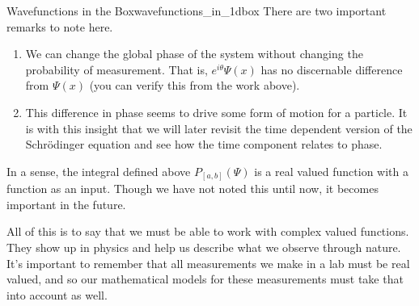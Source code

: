 \begin{ex}{Wavefunctions in the Box}{wavefunctions_in_1dbox}
	There are two important remarks to note here.
	\begin{enumerate}[1.]
		\item We can change the global phase of the system without changing the probability of measurement.  That is, $e^{i\theta}\Psi(x)$ has no discernable difference from $\Psi(x)$ (you can verify this from the work above).
		\item This difference in phase seems to drive some form of motion for a particle.  It is with this insight that we will later revisit the time dependent version of the Schr\"odinger equation and see how the time component relates to phase.
	\end{enumerate}
\end{ex}

\begin{remark}
	In a sense, the integral defined above $P_{[a,b]}(\Psi)$ is a real valued function with a function as an input.  Though we have not noted this until now, it becomes important in the future.
\end{remark}

All of this is to say that we must be able to work with complex valued functions.  They show up in physics and help us describe what we observe through nature.  It's important to remember that all measurements we make in a lab must be real valued, and so our mathematical models for these measurements must take that into account as well.